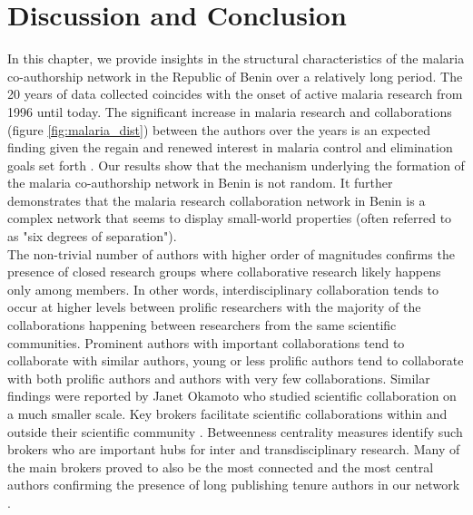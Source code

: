 \section{Discussion and Conclusion}
\label{sec:malaria_discussion}
In this chapter, we provide insights in the structural characteristics of the malaria co-authorship network in the Republic of Benin over a relatively long period. The 20 years of data collected coincides with the onset of active malaria research from 1996 until today. The significant increase in malaria research and collaborations (figure \ref{fig:malaria_dist}) between the authors over the years is an expected finding given the regain and renewed interest in malaria control and elimination goals set forth \cite{alonso_research_2011, breman_eradicating_2009}. Our results show that the mechanism underlying the formation of the malaria co-authorship network in Benin is not random. It further demonstrates that the malaria research collaboration network in Benin is a complex network that seems to display small-world properties (often referred to as "six degrees of separation"). \\%
The non-trivial number of authors with higher order of magnitudes confirms the presence of closed research groups where collaborative research likely happens only among members. In other words, interdisciplinary collaboration tends to occur at higher levels between prolific researchers with the majority of the collaborations happening between researchers from the same scientific communities. Prominent authors with important collaborations tend to collaborate with similar authors, young or less prolific authors tend to collaborate with both prolific authors and authors with very few collaborations. Similar findings were reported by Janet Okamoto \cite{the_centers_for_population_health_and_health_disparities_evaluation_working_group_scientific_2015} who studied scientific collaboration on a much smaller scale. %
Key brokers facilitate scientific collaborations within and outside their scientific community \cite{bellanca_measuring_2009}. Betweenness centrality measures identify such brokers who are important hubs for inter and transdisciplinary research. Many of the main brokers proved to also be the most connected and the most central authors confirming the presence of long publishing tenure authors in our network \cite{li_co-authorship_2013}. %

